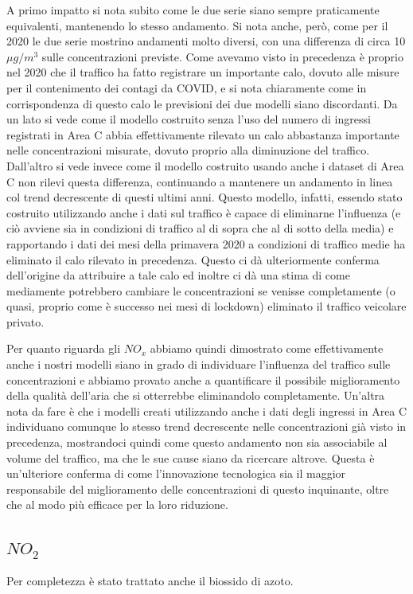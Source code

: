 \documentclass[a4paper,12pt]{report}
\begin{document}
A primo impatto si nota subito come le due serie siano sempre praticamente equivalenti, mantenendo lo stesso andamento. Si nota anche, però, come per il 2020 le due serie mostrino andamenti molto diversi, con una differenza di circa 10 $\mu g/m^3$ sulle concentrazioni previste.
Come avevamo visto in precedenza è proprio nel 2020 che il traffico ha fatto registrare un importante calo, dovuto alle misure per il contenimento dei contagi da COVID, e si nota chiaramente come in corrispondenza di questo calo le previsioni dei due modelli siano discordanti.
Da un lato si vede come il modello costruito senza l'uso del numero di ingressi registrati in Area C abbia effettivamente rilevato un calo abbastanza importante nelle concentrazioni misurate, dovuto proprio alla diminuzione del traffico. Dall'altro si vede invece come il modello costruito usando anche i dataset di Area C non rilevi questa differenza, continuando a mantenere un andamento in linea col trend decrescente di questi ultimi anni. Questo modello, infatti, essendo stato costruito utilizzando anche i dati sul traffico è capace di eliminarne l'influenza (e ciò avviene sia in condizioni di traffico al di sopra che al di sotto della media) e rapportando i dati dei mesi della primavera 2020 a condizioni di traffico medie ha eliminato il calo rilevato in precedenza. Questo ci dà ulteriormente conferma dell'origine da attribuire a tale calo ed inoltre ci dà una stima di come mediamente potrebbero cambiare le concentrazioni se venisse completamente (o quasi, proprio come è successo nei mesi di lockdown) eliminato il traffico veicolare privato.

Per quanto riguarda gli $NO_x$ abbiamo quindi dimostrato come effettivamente anche i nostri modelli siano in grado di individuare l'influenza del traffico sulle concentrazioni e abbiamo provato anche a quantificare il possibile miglioramento della qualità dell'aria che si otterrebbe eliminandolo completamente.
Un'altra nota da fare è che i modelli creati utilizzando anche i dati degli ingressi in Area C individuano comunque lo stesso trend decrescente nelle concentrazioni già visto in precedenza, mostrandoci quindi come questo andamento non sia associabile al volume del traffico, ma che le sue cause siano da ricercare altrove. Questa è un'ulteriore conferma di come l'innovazione tecnologica sia il maggior responsabile del miglioramento delle concentrazioni di questo inquinante, oltre che al modo più efficace per la loro riduzione.

\subsection{$NO_2$}
Per completezza è stato trattato anche il biossido di azoto.
\end{document}
